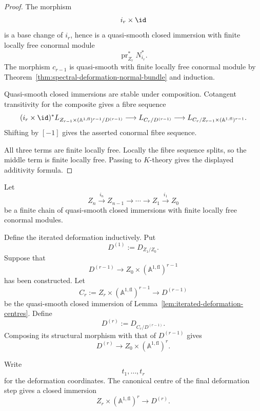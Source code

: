 \begin{proof}
The morphism
\[
    i_r\times\id
\]
is a base change of \(i_r\), hence is a quasi-smooth closed immersion with
finite locally free conormal module
\[
    \operatorname{pr}_{Z_r}^*N^*_{i_r}.
\]
The morphism \(c_{r-1}\) is quasi-smooth with finite locally free conormal
module by
Theorem~\ref{thm:spectral-deformation-normal-bundle} and induction.

Quasi-smooth closed immersions are stable under composition.  Cotangent
transitivity for the composite gives a fibre sequence
\[
    (i_r\times\id)^*
    L_{Z_{r-1}\times(\mathbb A^{1,\mathrm{fl}})^{r-1}/D^{(r-1)}}
    \longrightarrow
    L_{C_r/D^{(r-1)}}
    \longrightarrow
    L_{C_r/
      Z_{r-1}\times(\mathbb A^{1,\mathrm{fl}})^{r-1}}.
\]
Shifting by \([-1]\) gives the asserted conormal fibre sequence.

All three terms are finite locally free.  Locally the fibre sequence splits,
so the middle term is finite locally free.  Passing to \(K\)-theory gives
the displayed additivity formula.
\end{proof}

\begin{construction}
\label{constr:iterated-closed-deformation}
Let
\[
    Z_n\xrightarrow{i_n}Z_{n-1}
    \longrightarrow\cdots\longrightarrow
    Z_1\xrightarrow{i_1}Z_0
\]
be a finite chain of quasi-smooth closed immersions with finite locally free
conormal modules.

Define the iterated deformation inductively.  Put
\[
    D^{(1)}
    :=
    D_{Z_1/Z_0}.
\]
Suppose that
\[
    D^{(r-1)}
    \longrightarrow
    Z_0\times
    (\mathbb A^{1,\mathrm{fl}})^{r-1}
\]
has been constructed.  Let
\[
    C_r
    :=
    Z_r\times
    (\mathbb A^{1,\mathrm{fl}})^{r-1}
    \longrightarrow
    D^{(r-1)}
\]
be the quasi-smooth closed immersion of
Lemma~\ref{lem:iterated-deformation-centres}.  Define
\[
    D^{(r)}
    :=
    D_{C_r/D^{(r-1)}}.
\]
Composing its structural morphism with that of \(D^{(r-1)}\) gives
\[
    D^{(r)}
    \longrightarrow
    Z_0\times
    (\mathbb A^{1,\mathrm{fl}})^r.
\]

Write
\[
    t_1,\ldots,t_r
\]
for the deformation coordinates.  The canonical centre of the final
deformation step gives a closed immersion
\[
    Z_r\times
    (\mathbb A^{1,\mathrm{fl}})^r
    \longrightarrow
    D^{(r)}.
\]
\end{construction}

